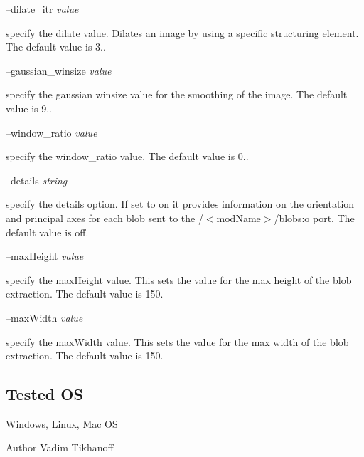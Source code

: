 --dilate\+\_\+itr {\itshape value} 
\begin{DoxyItemize}
\item specify the dilate value. Dilates an image by using a specific structuring element. The default value is 3..
\end{DoxyItemize}

--gaussian\+\_\+winsize {\itshape value} 
\begin{DoxyItemize}
\item specify the gaussian winsize value for the smoothing of the image. The default value is 9..
\end{DoxyItemize}

--window\+\_\+ratio {\itshape value} 
\begin{DoxyItemize}
\item specify the window\+\_\+ratio value. The default value is 0..
\end{DoxyItemize}

--details {\itshape string} 
\begin{DoxyItemize}
\item specify the details option. If set to on it provides information on the orientation and principal axes for each blob sent to the /$<$mod\+Name$>$/blobs\+:o port. The default value is off.
\end{DoxyItemize}

--max\+Height {\itshape value} 
\begin{DoxyItemize}
\item specify the max\+Height value. This sets the value for the max height of the blob extraction. The default value is 150.
\end{DoxyItemize}

--max\+Width {\itshape value} 
\begin{DoxyItemize}
\item specify the max\+Width value. This sets the value for the max width of the blob extraction. The default value is 150.
\end{DoxyItemize}\hypertarget{group__blobExtractor_tested_os_sec}{}\subsection{Tested OS}\label{group__blobExtractor_tested_os_sec}
Windows, Linux, Mac OS

\begin{DoxyAuthor}{Author}
Vadim Tikhanoff 
\end{DoxyAuthor}
